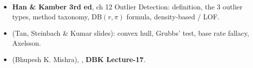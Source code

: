 \begin{itemize}
  \item \textbf{Han \& Kamber 3rd ed}, ch 12 Outlier Detection: definition, the 3 outlier types,
        method taxonomy, DB$(r,\pi)$ formula, density-based / LOF. 
  \item {} (Tan, Steinbach \& Kumar slides):
        convex hull, Grubbs' test, base rate fallacy, Axelsson.
  \item {} (Bhupesh K. Mishra), ,
        \textbf{DBK Lecture-17}.
\end{itemize}
